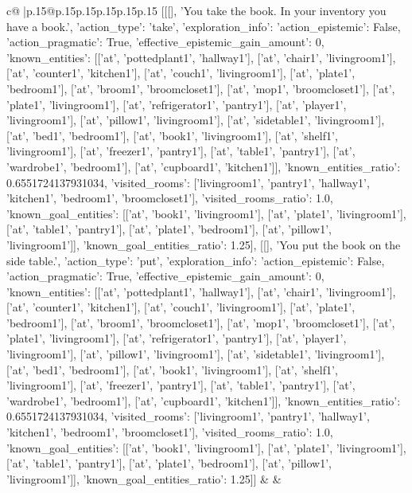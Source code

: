 \documentclass{article}
\begin{document}
{\begin{supertabular}{c@{$\;$}|p{.15\linewidth}@{}p{.15\linewidth}p{.15\linewidth}p{.15\linewidth}p{.15\linewidth}p{.15\linewidth}}
{{{	 [[[], 'You take the book. In your inventory you have a book.', {'action_type': 'take', 'exploration_info': {'action_epistemic': False, 'action_pragmatic': True, 'effective_epistemic_gain_amount': 0, 'known_entities': [['at', 'pottedplant1', 'hallway1'], ['at', 'chair1', 'livingroom1'], ['at', 'counter1', 'kitchen1'], ['at', 'couch1', 'livingroom1'], ['at', 'plate1', 'bedroom1'], ['at', 'broom1', 'broomcloset1'], ['at', 'mop1', 'broomcloset1'], ['at', 'plate1', 'livingroom1'], ['at', 'refrigerator1', 'pantry1'], ['at', 'player1', 'livingroom1'], ['at', 'pillow1', 'livingroom1'], ['at', 'sidetable1', 'livingroom1'], ['at', 'bed1', 'bedroom1'], ['at', 'book1', 'livingroom1'], ['at', 'shelf1', 'livingroom1'], ['at', 'freezer1', 'pantry1'], ['at', 'table1', 'pantry1'], ['at', 'wardrobe1', 'bedroom1'], ['at', 'cupboard1', 'kitchen1']], 'known_entities_ratio': 0.6551724137931034, 'visited_rooms': ['livingroom1', 'pantry1', 'hallway1', 'kitchen1', 'bedroom1', 'broomcloset1'], 'visited_rooms_ratio': 1.0, 'known_goal_entities': [['at', 'book1', 'livingroom1'], ['at', 'plate1', 'livingroom1'], ['at', 'table1', 'pantry1'], ['at', 'plate1', 'bedroom1'], ['at', 'pillow1', 'livingroom1']], 'known_goal_entities_ratio': 1.25}}], [[], 'You put the book on the side table.', {'action_type': 'put', 'exploration_info': {'action_epistemic': False, 'action_pragmatic': True, 'effective_epistemic_gain_amount': 0, 'known_entities': [['at', 'pottedplant1', 'hallway1'], ['at', 'chair1', 'livingroom1'], ['at', 'counter1', 'kitchen1'], ['at', 'couch1', 'livingroom1'], ['at', 'plate1', 'bedroom1'], ['at', 'broom1', 'broomcloset1'], ['at', 'mop1', 'broomcloset1'], ['at', 'plate1', 'livingroom1'], ['at', 'refrigerator1', 'pantry1'], ['at', 'player1', 'livingroom1'], ['at', 'pillow1', 'livingroom1'], ['at', 'sidetable1', 'livingroom1'], ['at', 'bed1', 'bedroom1'], ['at', 'book1', 'livingroom1'], ['at', 'shelf1', 'livingroom1'], ['at', 'freezer1', 'pantry1'], ['at', 'table1', 'pantry1'], ['at', 'wardrobe1', 'bedroom1'], ['at', 'cupboard1', 'kitchen1']], 'known_entities_ratio': 0.6551724137931034, 'visited_rooms': ['livingroom1', 'pantry1', 'hallway1', 'kitchen1', 'bedroom1', 'broomcloset1'], 'visited_rooms_ratio': 1.0, 'known_goal_entities': [['at', 'book1', 'livingroom1'], ['at', 'plate1', 'livingroom1'], ['at', 'table1', 'pantry1'], ['at', 'plate1', 'bedroom1'], ['at', 'pillow1', 'livingroom1']], 'known_goal_entities_ratio': 1.25}}]] 
	  } 
	   } 
	   } 
	 & & \\ 
 

    \theutterance {}  


\end{supertabular}}
\end{document}
